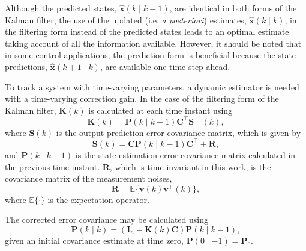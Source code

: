 {Although the predicted states, $\hat{\mathbf{x}}(k \mid k-1)$, are identical in both forms of the Kalman filter, the use of the updated (i.e. \textit{a posteriori}) estimates, $\hat{\mathbf{x}}(k \mid k)$, in the filtering form instead of the predicted states leads to an optimal estimate taking account of all the information available. However, it should be noted that in some control applications, the prediction form is beneficial because the state predictions, $\hat{\mathbf{x}}(k+1 \mid k)$, are available one time step ahead.

To track a system with time-varying parameters, a dynamic estimator is needed with a time-varying correction gain. In the case of the filtering form of the Kalman filter, $\mathbf{K}(k)$ is calculated at each time instant using
\begin{equation} \label{eq:Kk}
	\mathbf{K}(k) = \mathbf{P}(k \mid k-1)\mathbf{C}^\intercal \mathbf{S}^{-1}(k),
\end{equation}
where $\mathbf{S}(k)$ is the output prediction error covariance matrix, which is given by
%
\begin{equation} \label{eq:Sk}
	\mathbf{S}(k) = \mathbf{C}\mathbf{P}(k \mid k-1)\mathbf{C}^\intercal + \mathbf{R},
\end{equation}
%
and $\mathbf{P}(k \mid k-1)$ is the state estimation error covariance matrix calculated in the previous time instant. $\mathbf{R}$, which is time invariant in this work, is the covariance matrix of the measurement noises,
%
\begin{equation} \label{eq:R}
	 \mathbf{R} = \mathbb{E}\{ \mathbf{v}(k) \mathbf{v}^\intercal(k) \},
\end{equation}
%
where $\mathbb{E}\{\cdot\}$ is the expectation operator.

The corrected error covariance may be calculated using
%
\begin{equation} \label{eq:Pk}
	\mathbf{P}(k \mid k) = \left( \mathbf{I}_n - \mathbf{K}(k) \mathbf{C} \right) \mathbf{P}(k \mid k-1),
\end{equation}
given an initial covariance estimate at time zero, $\mathbf{P}(0 \mid -1)=\mathbf{P}_0$.%

}
